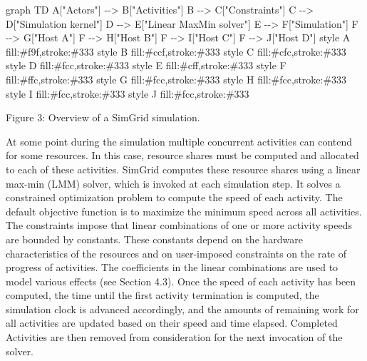 \documentclass[
]{article}
\newenvironment{Shaded}{}{}
\newcommand{\NormalTok}[1]{#1}
\begin{document}
\begin{Shaded}
\begin{Highlighting}[]
\NormalTok{graph TD}
\NormalTok{    A["Actors"] {-}{-}\textgreater{} B["Activities"]}
\NormalTok{    B {-}{-}\textgreater{} C["Constraints"]}
\NormalTok{    C {-}{-}\textgreater{} D["Simulation kernel"]}
\NormalTok{    D {-}{-}\textgreater{} E["Linear MaxMin solver"]}
\NormalTok{    E {-}{-}\textgreater{} F["Simulation"]}
\NormalTok{    F {-}{-}\textgreater{} G["Host A"]}
\NormalTok{    F {-}{-}\textgreater{} H["Host B"]}
\NormalTok{    F {-}{-}\textgreater{} I["Host C"]}
\NormalTok{    F {-}{-}\textgreater{} J["Host D"]}
\NormalTok{    style A fill:\#f9f,stroke:\#333}
\NormalTok{    style B fill:\#ccf,stroke:\#333}
\NormalTok{    style C fill:\#cfc,stroke:\#333}
\NormalTok{    style D fill:\#fcc,stroke:\#333}
\NormalTok{    style E fill:\#cff,stroke:\#333}
\NormalTok{    style F fill:\#ffc,stroke:\#333}
\NormalTok{    style G fill:\#fcc,stroke:\#333}
\NormalTok{    style H fill:\#fcc,stroke:\#333}
\NormalTok{    style I fill:\#fcc,stroke:\#333}
\NormalTok{    style J fill:\#fcc,stroke:\#333}
\end{Highlighting}
\end{Shaded}

Figure 3: Overview of a SimGrid simulation.

At some point during the simulation multiple concurrent activities can
contend for some resources. In this case, resource shares must be
computed and allocated to each of these activities. SimGrid computes
these resource shares using a linear max-min (LMM) solver, which is
invoked at each simulation step. It solves a constrained optimization
problem to compute the speed of each activity. The default objective
function is to maximize the minimum speed across all activities. The
constraints impose that linear combinations of one or more activity
speeds are bounded by constants. These constants depend on the hardware
characteristics of the resources and on user-imposed constraints on the
rate of progress of activities. The coefficients in the linear
combinations are used to model various effects (see Section 4.3). Once
the speed of each activity has been computed, the time until the first
activity termination is computed, the simulation clock is advanced
accordingly, and the amounts of remaining work for all activities are
updated based on their speed and time elapsed. Completed Activities are
then removed from consideration for the next invocation of the solver.
\end{document}
